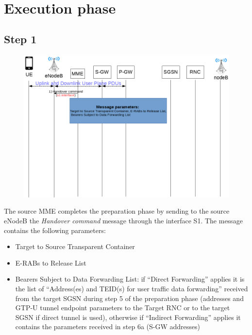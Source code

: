 \section{Execution phase}



\subsection*{Step 1}
\begin{figure}[!htb]
	\centering
	\includegraphics[width=0.9\linewidth]{img/execution-1.png}
	\label{fig:exec-1}
\end{figure}
The source MME completes the preparation phase by sending to the source eNodeB
the \emph{Handover command} message through the interface S1. The message
contains the following parameters:
\begin{itemize}
    \item Target to Source Transparent Container
    \item E-RABs to Release List
    \item Bearers Subject to Data Forwarding List: if ``Direct
    Forwarding'' applies it is the list of ``Address(es) and TEID(s) for user
    traffic data forwarding'' received from the target SGSN during step 5
    of the preparation phase (addresses and GTP-U tunnel endpoint parameters to
    the Target RNC or to the target SGSN if direct tunnel is used), otherwise
    if ``Indirect Forwarding'' applies it contains the parameters received in
    step 6a (S-GW addresses)
\end{itemize}



\clearpage
